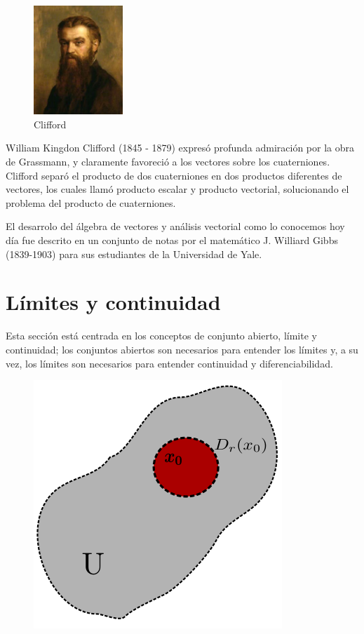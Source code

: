 \begin{figure}
  \begin{center}
    \includegraphics[width=0.3\textwidth]{gfx/clifford}
  \end{center}
  \caption{Clifford}
\end{figure}

William Kingdon Clifford (1845 - 1879) expresó profunda admiración por la obra de Grassmann, y claramente
favoreció a los vectores sobre los cuaterniones. Clifford separó el producto de dos cuaterniones en dos
productos diferentes de vectores, los cuales llamó producto escalar y producto vectorial, solucionando
el problema del producto de cuaterniones.

El desarrolo del álgebra de vectores y análisis vectorial como lo conocemos hoy día fue descrito en un conjunto
de notas por el matemático J. Williard Gibbs (1839-1903) para sus estudiantes de la Universidad de Yale.

\clearpage


\section{Límites y continuidad}

Esta sección está centrada en los conceptos de conjunto abierto, límite y continuidad; los conjuntos abiertos son necesarios para entender los límites y, a su vez, los límites son necesarios para entender continuidad y diferenciabilidad.

\begin{figure}[!ht]
  \begin{center}
      \includegraphics[width=0.5\linewidth]{gfx/conjunto-abierto}
      \caption{}
      \label{fig:boat1}
  \end{center}
\end{figure}

